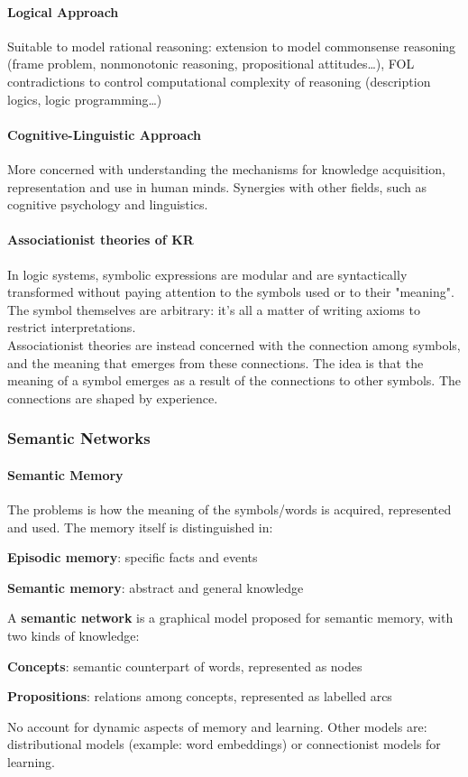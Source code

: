 \documentclass[10pt]{report}
\begin{document}
\paragraph{Logical Approach} Suitable to model rational reasoning: extension to model commonsense reasoning (frame problem, nonmonotonic reasoning, propositional attitudes\ldots), FOL contradictions to control computational complexity of reasoning (description logics, logic programming\ldots)
\paragraph{Cognitive-Linguistic Approach} More concerned with understanding the mechanisms for knowledge acquisition, representation and use in human minds. Synergies with other fields, such as cognitive psychology and linguistics.
\paragraph{Associationist theories of KR} In logic systems, symbolic expressions are modular and are syntactically transformed without paying attention to the symbols used or to their "meaning". The symbol themselves are arbitrary: it's all a matter of writing axioms to restrict interpretations.\\
Associationist theories are instead concerned with the connection among symbols, and the meaning that emerges from these connections. The idea is that the meaning of a symbol emerges as a result of the connections to other symbols. The connections are shaped by experience.
\subsubsection{Semantic Networks}
\paragraph{Semantic Memory} The problems is how the meaning of the symbols/words is acquired, represented and used. The memory itself is distinguished in:
\begin{list}{}{}
	\item \textbf{Episodic memory}: specific facts and events
	\item \textbf{Semantic memory}: abstract and general knowledge
\end{list}
A \textbf{semantic network} is a graphical model proposed for semantic memory, with two kinds of knowledge:
\begin{list}{}{}
	\item \textbf{Concepts}: semantic counterpart of words, represented as nodes
	\item \textbf{Propositions}: relations among concepts, represented as labelled arcs
\end{list}
No account for dynamic aspects of memory and learning. Other models are: distributional models (example: word embeddings) or connectionist models for learning.
\end{document}
